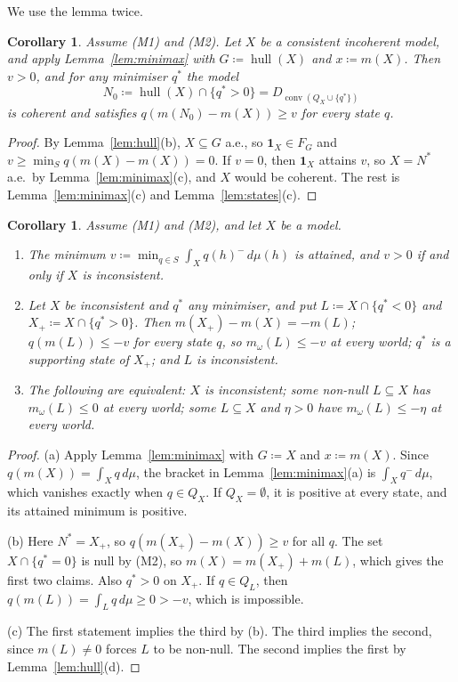 \documentclass[11pt]{article}
\newcommand{\one}{\mathbf{1}}
\newcommand{\hull}{\operatorname{hull}}
\DeclareMathOperator{\conv}{conv}
\theoremstyle{plain}
\newtheorem{corollary}[theorem]{Corollary}
\theoremstyle{definition}
\theoremstyle{remark}
\begin{document}
We use the lemma twice.

\begin{corollary}\label{cor:consistent}
Assume (M1) and (M2). Let $X$ be a consistent incoherent model, and apply
Lemma~\ref{lem:minimax} with $G\coloneqq\hull(X)$ and $x\coloneqq m(X)$. Then $v>0$, and for
any minimiser $q^\ast$ the model
\[
  N_0\coloneqq\hull(X)\cap\{q^\ast>0\}=D_{\conv(Q_X\cup\{q^\ast\})}
\]
is coherent and satisfies $q(m(N_0)-m(X))\ge v$ for every state $q$.
\end{corollary}

\begin{proof}
By Lemma~\ref{lem:hull}(b), $X\subseteq G$ a.e., so $\one_X\in F_G$ and $v\ge\min_Sq(m(X)-
m(X))=0$. If $v=0$, then $\one_X$ attains $v$, so $X=N^\ast$ a.e.\ by
Lemma~\ref{lem:minimax}(c), and $X$ would be coherent. The rest is Lemma~\ref{lem:minimax}(c)
and Lemma~\ref{lem:states}(c).
\end{proof}

\begin{corollary}\label{cor:losing}
Assume (M1) and (M2), and let $X$ be a model.
\begin{enumerate}[label=(\alph*)]
  \item The minimum $v\coloneqq\min_{q\in S}\int_Xq(h)^-\,d\mu(h)$ is attained, and $v>0$
  if and only if $X$ is inconsistent.
  \item Let $X$ be inconsistent and $q^\ast$ any minimiser, and put $L\coloneqq X\cap\{q^\ast<0\}$
  and $X_+\coloneqq X\cap\{q^\ast>0\}$. Then $m(X_+)-m(X)=-m(L)$; $q(m(L))\le-v$ for every
  state $q$, so $m_\omega(L)\le-v$ at every world; $q^\ast$ is a supporting state of $X_+$;
  and $L$ is inconsistent.
  \item The following are equivalent: $X$ is inconsistent; some non-null $L\subseteq X$ has
  $m_\omega(L)\le0$ at every world; some $L\subseteq X$ and $\eta>0$ have $m_\omega(L)\le-\eta$
  at every world.
\end{enumerate}
\end{corollary}

\begin{proof}
(a) Apply Lemma~\ref{lem:minimax} with $G\coloneqq X$ and $x\coloneqq m(X)$. Since $q(m(X))=
\int_Xq\,d\mu$, the bracket in Lemma~\ref{lem:minimax}(a) is $\int_Xq^-\,d\mu$, which vanishes
exactly when $q\in Q_X$. If $Q_X=\emptyset$, it is positive at every state, and its attained
minimum is positive.

(b) Here $N^\ast=X_+$, so $q(m(X_+)-m(X))\ge v$ for all $q$. The set $X\cap\{q^\ast=0\}$ is
null by (M2), so $m(X)=m(X_+)+m(L)$, which gives the first two claims. Also $q^\ast>0$ on
$X_+$. If $q\in Q_L$, then $q(m(L))=\int_Lq\,d\mu\ge0>-v$, which is impossible.

(c) The first statement implies the third by (b). The third implies the second, since
$m(L)\ne0$ forces $L$ to be non-null. The second implies the first by
Lemma~\ref{lem:hull}(d).
\end{proof}
\end{document}

